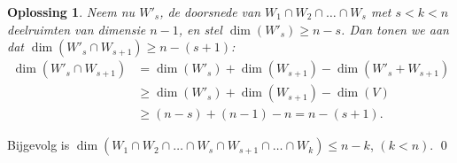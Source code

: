 \documentclass[a4paper,12pt]{article}
\newtheorem{oplossing}{Oplossing}
\begin{document}
\begin{enumerate}
\begin{itemize}
\begin{oplossing}
        Neem nu \(W'_s\), de doorsnede van \(W_1 \cap W_2 \cap \dots \cap W_s \) met \(s < k < n\) deelruimten van dimensie \(n-1\), en stel \(\dim(W'_s) \geq n-s\).
        Dan tonen we aan dat \(\dim(W'_s \cap W_{s+1}) \geq n-(s+1)\):
        \begin{align*}
            \dim(W'_s \cap W_{s+1})
            &= \dim(W'_s) + \dim (W_{s+1}) - \dim(W'_s + W_{s+1})\\
            &\geq \dim(W'_s) + \dim (W_{s+1}) - \dim(V)\\
            &\geq (n-s) + (n-1) - n = n- (s+1).
        \end{align*}
    \end{oplossing}
    Bijgevolg is \(\dim\left(W_1 \cap W_2 \cap \dots \cap W_s \cap W_{s+1} \cap \dots \cap W_k \right) \leq n-k \), \((k < n)\).
    \qed
\end{itemize}

\vspace{0.5cm}


\end{enumerate}
\end{document}
